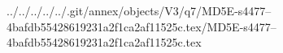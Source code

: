 ../../../../../.git/annex/objects/V3/q7/MD5E-s4477--4bafdb55428619231a2f1ca2af11525c.tex/MD5E-s4477--4bafdb55428619231a2f1ca2af11525c.tex